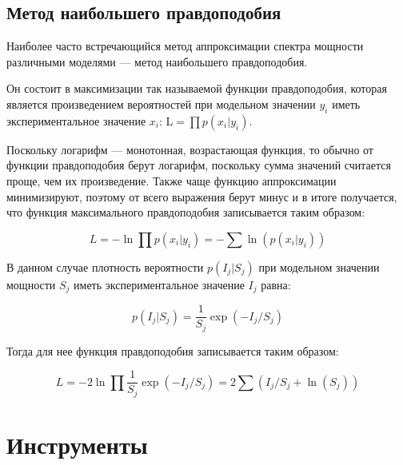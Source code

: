 		 
	
	\newpage
	
	\subsection{Метод наибольшего правдоподобия}
	
		Наиболее часто встречающийся метод аппроксимации спектра мощности различными моделями --- метод наибольшего правдоподобия. 
		
		Он состоит в максимизации так называемой функции правдоподобия, которая является произведением вероятностей при модельном значении $y_i$ иметь экспериментальное значение $x_i$: $\mathrm{L} = \prod p ( x_i | y_i )$. 
		
		Поскольку логарифм --- монотонная, возрастающая функция, то обычно от функции правдоподобия берут логарифм, поскольку сумма значений считается проще, чем их произведение. Также чаще функцию аппроксимации минимизируют, поэтому от всего выражения берут минус и в итоге получается, что функция максимального правдоподобия записывается таким образом: 
		
		$$ L = - \ln \prod p ( x_i | y_i ) = - \sum \ln ( p ( x_i | y_i ) )$$
		
		В данном случае плотность вероятности $p ( I_j | S_j )$ при модельном значении мощности $S_j$ иметь экспериментальное значение $I_j$ равна:
		
		\begin{equation}
			p ( I_j | S_j ) = \frac{1}{S_j} \exp ( - I_j / S_j)
		\end{equation}
		
		Тогда для нее функция правдоподобия записывается таким образом:
		
		\begin{equation}
			L = - 2 \ln \prod \frac{1}{S_j} \exp ( - I_j / S_j) = 2 \sum \left( I_j / S_j + \ln ( S_j ) \right)
		\end{equation}

\section{Инструменты}
	
